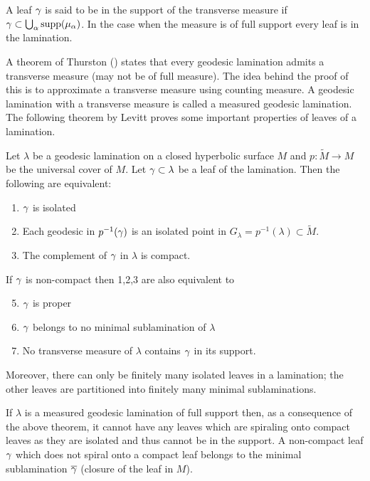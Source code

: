 \begin{rem}
  A leaf $\gamma$ is said to be in the support of the transverse measure if $\gamma \subset \bigcup_{\alpha} \text{supp} (\mu_\alpha)$. In the case when the measure is of full support every leaf is in the lamination. 
\end{rem}
A theorem of Thurston (\cite{thurston-book}) states that every geodesic lamination admits a transverse measure (may not be of full measure). The idea behind the proof of this is to approximate a transverse measure using counting measure. A geodesic lamination with a transverse measure is called a measured geodesic lamination. The following theorem by Levitt proves some important properties of leaves of a lamination.

\begin{theorem}
  Let $\lambda$ be a geodesic lamination on a closed hyperbolic surface $M$ and $p:\tilde{M}\to M$ be the universal cover of $M$. Let $\gamma\subset \lambda$ be a leaf of the lamination. Then the following are equivalent:
  \begin{enumerate}
    \item $\gamma$ is isolated
    \item Each geodesic in $p^{-1}(\gamma)$ is an isolated point in $G_\lambda = p^{-1}(\lambda)\subset \tilde{M}$.
    \item The complement of $\gamma$ in $\lambda$ is compact.
  \end{enumerate}
  If $\gamma$ is non-compact then 1,2,3 are also equivalent to 
  \begin{enumerate}
    \setcounter{enumi}{4}
    \item $\gamma$ is proper
    \item $\gamma$ belongs to no minimal sublamination of $\lambda$
    \item No transverse measure of $\lambda$ contains $\gamma$ in its support.
  \end{enumerate}
  Moreover, there can only be finitely many isolated leaves in a lamination; the other leaves are partitioned into finitely many minimal sublaminations.
\end{theorem}
If $\lambda$ is a measured geodesic lamination of full support then, as a consequence of the above theorem, it cannot have any leaves which are spiraling onto compact leaves as they are isolated and thus cannot be in the support. A non-compact leaf $\gamma$ which does not spiral onto a compact leaf belongs to the minimal sublamination $\overline{\gamma}$ (closure of the leaf in $M$).\\

